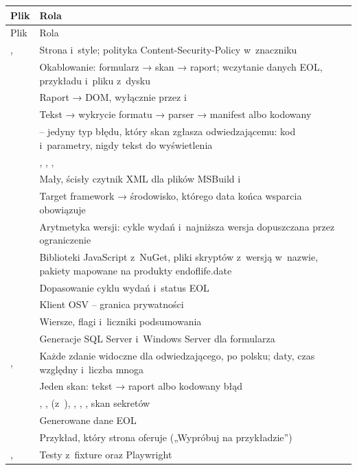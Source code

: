 \begin{xltabular}{\linewidth}{@{}>{\raggedright\arraybackslash}p{4.4cm} >{\raggedright\arraybackslash}X@{}}
\toprule
Plik & Rola \\
\midrule
\endfirsthead
\toprule
Plik & Rola \\
\midrule
\endhead
{},  & Strona i~style; polityka Content-Security-Policy w~znaczniku  \\
 & Okablowanie: formularz → skan → raport; wczytanie danych EOL, przykładu i~pliku z~dysku \\
 & Raport → DOM, wyłącznie przez  i~ \\
 & Tekst → wykrycie formatu → parser → manifest albo kodowany  \\
 &  -- jedyny typ błędu, który skan zgłasza odwiedzającemu: kod i~parametry, nigdy tekst do wyświetlenia \\
 & , , ,  \\
 & Mały, ścisły czytnik XML dla plików MSBuild i~ \\
 & Target framework → środowisko, którego data końca wsparcia obowiązuje \\
 & Arytmetyka wersji: cykle wydań i~najniższa wersja dopuszczana przez ograniczenie \\
 & Biblioteki JavaScript z~NuGet, pliki skryptów z~wersją w~nazwie, pakiety mapowane na produkty endoflife.date \\
 & Dopasowanie cyklu wydań i~status EOL \\
 & Klient OSV -- granica prywatności \\
 & Wiersze, flagi i~liczniki podsumowania \\
 & Generacje SQL Server i~Windows Server dla formularza \\
,  & Każde zdanie widoczne dla odwiedzającego, po polsku; daty, czas względny i~liczba mnoga \\
 & Jeden skan: tekst → raport albo kodowany błąd \\
 & , ,  (z~), , , , skan sekretów \\
 & Generowane dane EOL \\
 & Przykład, który strona oferuje („Wypróbuj na przykładzie”) \\
,  & Testy  z~fixture oraz Playwright \\
\bottomrule
\end{xltabular}

